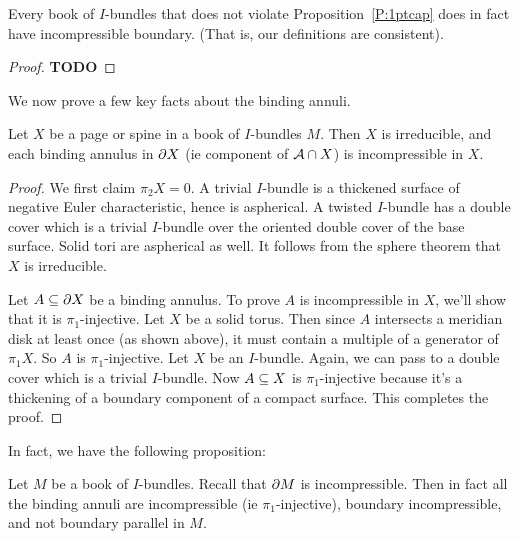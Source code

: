 \begin{prop}

Every book of $I$-bundles that does not violate Proposition~\ref{P:1ptcap} does
in fact have incompressible boundary. (That is, our definitions are
consistent).

\end{prop}

\begin{proof}

\textbf{TODO}

\end{proof}

We now prove a few key facts about the binding annuli.

\begin{prop}\label{P:pagespineII}

Let $X$ be a page or spine in a book of $I$-bundles $M$. Then $X$ is
irreducible, and each binding annulus in $\partial X$ (ie component of $\mathcal{A} \cap X$)
is incompressible in $X$.

\end{prop}

\begin{proof}

We first claim $\pi_2X = 0$. A trivial $I$-bundle is a thickened surface of
negative Euler characteristic, hence is aspherical. A twisted $I$-bundle has
a double cover which is a trivial $I$-bundle over the oriented double cover of
the base surface. Solid tori are aspherical as well. It follows from the sphere
theorem that $X$ is irreducible.

Let $A \subseteq \partial X$ be a binding annulus. To prove $A$ is incompressible in $X$,
we'll show that it is $\pi_1$-injective. Let $X$ be a solid torus. Then since
$A$ intersects a meridian disk at least once (as shown above), it must contain
a multiple of a generator of $\pi_1X$. So $A$ is $\pi_1$-injective. Let $X$ be
an $I$-bundle. Again, we can pass to a double cover which is a trivial
$I$-bundle.  Now $A \subseteq X$ is $\pi_1$-injective because it's a thickening of
a boundary component of a compact surface. This completes the proof.

\end{proof}

In fact, we have the following proposition:

\begin{prop}

Let $M$ be a book of $I$-bundles. Recall that $\partial M$ is incompressible.  Then
in fact all the binding annuli are incompressible (ie $\pi_1$-injective),
boundary incompressible, and not boundary parallel in $M$.

\end{prop}

